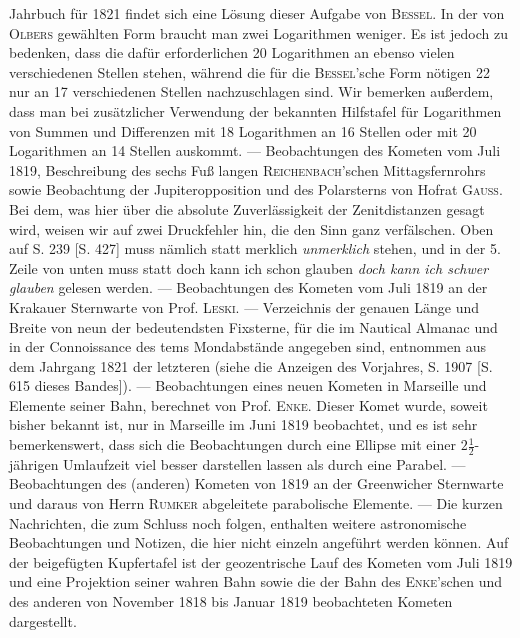 Jahrbuch für 1821 findet sich eine Lösung dieser Aufgabe von \textsc{Bessel}. In der von \textsc{Olbers} gewählten Form braucht man zwei Logarithmen weniger. Es ist jedoch zu bedenken, dass die dafür erforderlichen 20 Logarithmen an ebenso vielen verschiedenen Stellen stehen, während die für die \textsc{Bessel}'sche Form nötigen 22 nur an 17 verschiedenen Stellen nachzuschlagen sind. Wir bemerken außerdem, dass man bei zusätzlicher Verwendung der bekannten Hilfstafel für Logarithmen von Summen und Differenzen mit 18 Logarithmen an 16 Stellen oder mit 20 Logarithmen an 14 Stellen auskommt. --- Beobachtungen des Kometen vom Juli 1819, Beschreibung des sechs Fuß langen \textsc{Reichenbach}'schen Mittagsfernrohrs sowie Beobachtung der Jupiteropposition und des Polarsterns von Hofrat \textsc{Gauss}. Bei dem, was hier über die absolute Zuverlässigkeit der Zenitdistanzen gesagt wird, weisen wir auf zwei Druckfehler hin, die den Sinn ganz verfälschen. Oben auf S. 239 [S. 427] muss nämlich statt merklich \emph{unmerklich} stehen, und in der 5. Zeile von unten muss statt doch kann ich schon glauben \emph{doch kann ich schwer glauben} gelesen werden. --- Beobachtungen des Kometen vom Juli 1819 an der Krakauer Sternwarte von Prof. \textsc{Leski}. --- Verzeichnis der genauen Länge und Breite von neun der bedeutendsten Fixsterne, für die im Nautical Almanac und in der Connoissance des tems Mondabstände angegeben sind, entnommen aus dem Jahrgang 1821 der letzteren (siehe die Anzeigen des Vorjahres, S. 1907 [S. 615 dieses Bandes]). --- Beobachtungen eines neuen Kometen in Marseille und Elemente seiner Bahn, berechnet von Prof. \textsc{Enke}. Dieser Komet wurde, soweit bisher bekannt ist, nur in Marseille im Juni 1819 beobachtet, und es ist sehr bemerkenswert, dass sich die Beobachtungen durch eine Ellipse mit einer $2\frac{1}{2}$-jährigen
Umlaufzeit viel besser darstellen lassen als durch eine Parabel. --- Beobachtungen des (anderen) Kometen von 1819 an der Greenwicher Sternwarte und daraus von Herrn \textsc{Rumker} abgeleitete parabolische Elemente. --- Die kurzen Nachrichten, die zum Schluss noch folgen, enthalten weitere astronomische Beobachtungen und Notizen, die hier nicht einzeln angeführt werden können. Auf der beigefügten Kupfertafel ist der geozentrische Lauf des Kometen vom Juli 1819 und eine Projektion seiner wahren Bahn sowie die der Bahn des \textsc{Enke}'schen und des anderen von November 1818 bis Januar 1819 beobachteten Kometen dargestellt.
\par\clearpage\endgroup
